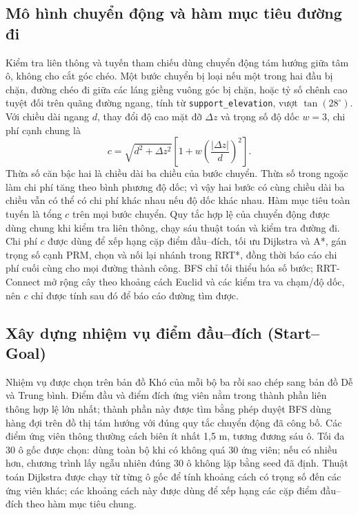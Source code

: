 \documentclass[11pt]{article}
\begin{document}
\subsection{Mô hình chuyển động và hàm mục tiêu đường đi}

Kiểm tra liên thông và tuyến tham chiếu dùng chuyển động tám hướng giữa tâm ô,
không cho cắt góc chéo. Một bước chuyển bị loại nếu một trong hai đầu bị chặn,
đường chéo đi giữa các láng giềng vuông góc bị chặn, hoặc tỷ số chênh cao tuyệt
đối trên quãng đường ngang, tính từ \texttt{support\_elevation}, vượt
$\tan(28^\circ)$. Với chiều dài ngang $d$, thay đổi độ cao mặt đỡ $\Delta z$ và
trọng số độ dốc $w=3$, chi phí
cạnh chung là
\begin{equation}
  c=\sqrt{d^2+\Delta z^2}
  \left[1+w\left(\frac{|\Delta z|}{d}\right)^2\right].
\end{equation}
Thừa số căn bậc hai là chiều dài ba chiều của bước chuyển. Thừa số trong ngoặc
làm chi phí tăng theo bình phương độ dốc; vì vậy hai bước có cùng chiều dài ba
chiều vẫn có thể có chi phí khác nhau nếu độ dốc khác nhau.
Hàm mục tiêu toàn tuyến là tổng $c$ trên mọi bước chuyển. Quy tắc hợp lệ của
chuyển động được dùng chung khi kiểm tra liên thông, chạy sáu thuật toán và kiểm
tra đường đi. Chi phí $c$ được dùng để xếp hạng cặp điểm đầu--đích, tối ưu Dijkstra
và A*, gán trọng số cạnh PRM, chọn và nối lại nhánh trong RRT*, đồng thời báo cáo
chi phí cuối cùng cho mọi đường thành công. BFS chỉ tối thiểu hóa số bước;
RRT-Connect mở rộng cây theo khoảng cách Euclid và các kiểm tra va chạm/độ dốc,
nên $c$ chỉ được tính sau đó để báo cáo đường tìm được.

\subsection{Xây dựng nhiệm vụ điểm đầu--đích (Start--Goal)}

Nhiệm vụ được chọn trên bản đồ Khó của mỗi bộ ba rồi sao chép sang bản đồ
Dễ và Trung bình. Điểm đầu và điểm đích ứng viên nằm trong thành phần liên thông
hợp lệ lớn nhất; thành phần này được tìm bằng phép duyệt BFS dùng hàng đợi trên
đồ thị tám hướng với đúng quy tắc chuyển động đã công bố. Các điểm ứng viên
thông thường cách biên ít nhất 1,5 m, tương đương sáu ô. Tối đa 30 ô gốc được
chọn: dùng toàn bộ khi có không quá 30 ứng viên; nếu có nhiều hơn, chương trình
lấy ngẫu nhiên đúng 30 ô không lặp bằng seed đã định. Thuật toán Dijkstra\cite{dijkstra} được chạy từ từng ô gốc
để tính khoảng cách có trọng số đến các ứng viên khác; các khoảng cách này được
dùng để xếp hạng các cặp điểm đầu--đích theo hàm mục tiêu chung.
\end{document}

